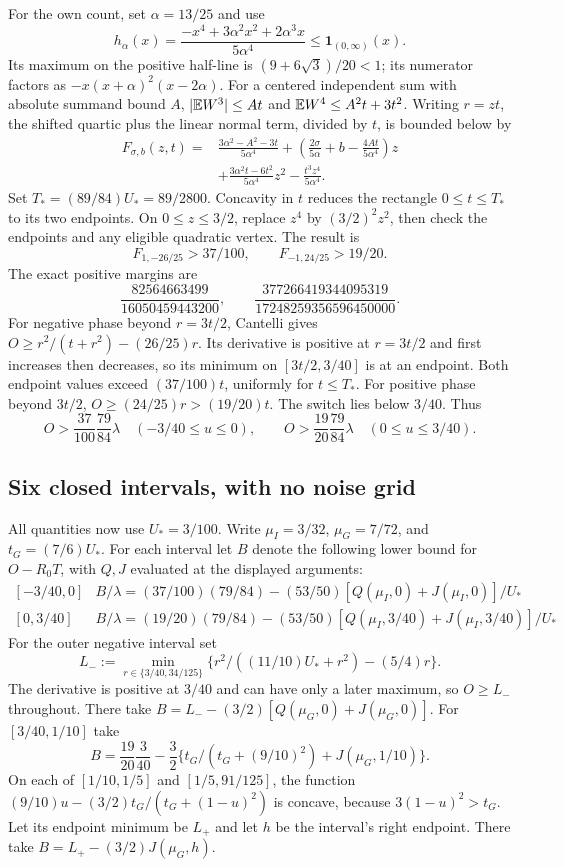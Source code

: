 For the own count, set $\alpha=13/25$ and use
\[
 h_\alpha(x)=\frac{-x^4+3\alpha^2x^2+2\alpha^3x}{5\alpha^4}
                     \le\mathbf1_{(0,\infty)}(x).
\]
Its maximum on the positive half-line is $(9+6\sqrt3)/20<1$;
its numerator factors as $-x(x+\alpha)^2(x-2\alpha)$.
For a centered independent sum with absolute summand bound $A$,
$|\mathbb E W^3|\le At$ and $\mathbb E W^4\le A^2t+3t^2$.
Writing $r=zt$, the shifted quartic plus the linear normal term,
divided by $t$, is bounded below by
\begin{align*}
 F_{\sigma,b}(z,t)={}&\frac{3\alpha^2-A^2-3t}{5\alpha^4}
 +\left(\frac{2\sigma}{5\alpha}+b-\frac{4At}{5\alpha^4}\right)z\\
 &+\frac{3\alpha^2t-6t^2}{5\alpha^4}z^2
                 -\frac{t^3z^4}{5\alpha^4}.
\end{align*}
Set $T_*=(89/84)U_*=89/2800$. Concavity in $t$ reduces the
rectangle $0\le t\le T_*$ to its two endpoints. On $0\le z\le3/2$,
replace $z^4$ by $(3/2)^2z^2$, then check the endpoints and any
eligible quadratic vertex. The result is
\[
 F_{1,-26/25}>37/100,
 \qquad F_{-1,24/25}>19/20.
\]
The exact positive margins are
\[
 \frac{82564663499}{16050459443200},\qquad
 \frac{377266419344095319}{17248259356596450000}.
\]
For negative phase beyond $r=3t/2$, Cantelli gives
$O\ge r^2/(t+r^2)-(26/25)r$. Its derivative is positive at
$r=3t/2$ and first increases then decreases, so its minimum on
$[3t/2,3/40]$ is at an endpoint. Both endpoint values exceed
$(37/100)t$, uniformly for $t\le T_*$. For positive phase beyond
$3t/2$, $O\ge(24/25)r>(19/20)t$. The switch lies below $3/40$.
Thus
\begin{equation}\label{v11:counts:own}
 O>\frac{37}{100}\frac{79}{84}\lambda\quad(-3/40\le u\le0),
 \qquad
 O>\frac{19}{20}\frac{79}{84}\lambda\quad(0\le u\le3/40).
\end{equation}

\subsection{Six closed intervals, with no noise grid}
All quantities now use $U_*=3/100$. Write
$\mu_I=3/32$, $\mu_G=7/72$, and $t_G=(7/6)U_*$.
For each interval let $B$ denote the following lower bound for
$O-R_0T$, with $Q,J$ evaluated at the displayed arguments:
\[
\begin{array}{c|l}
[-3/40,0]&B/\lambda=(37/100)(79/84)-(53/50)[Q(\mu_I,0)+J(\mu_I,0)]/U_*\\[2pt]
[0,3/40]&B/\lambda=(19/20)(79/84)
 -(53/50)[Q(\mu_I,3/40)+J(\mu_I,3/40)]/U_*
\end{array}
\]
For the outer negative interval set
\[
 L_-:=\min_{r\in\{3/40,34/125\}}
       \{r^2/((11/10)U_*+r^2)-(5/4)r\}.
\]
The derivative is positive at $3/40$ and can have only a later maximum,
so $O\ge L_-$ throughout. There take
$B=L_--(3/2)[Q(\mu_G,0)+J(\mu_G,0)]$.
For $[3/40,1/10]$ take
\[
 B=\frac{19}{20}\frac3{40}
     -\frac32\{t_G/(t_G+(9/10)^2)+J(\mu_G,1/10)\}.
\]
On each of $[1/10,1/5]$ and $[1/5,91/125]$, the function
$(9/10)u-(3/2)t_G/(t_G+(1-u)^2)$ is concave, because
$3(1-u)^2>t_G$. Let its endpoint minimum be $L_+$ and let $h$
be the interval's right endpoint. There take
$B=L_+-(3/2)J(\mu_G,h)$.

